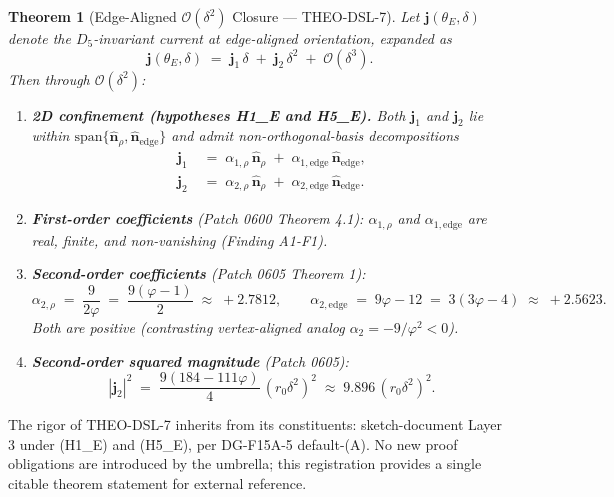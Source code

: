 \documentclass[11pt]{article}
\newtheorem{theorem}{Theorem}
\begin{document}
\begin{theorem}[Edge-Aligned $\mathcal{O}(\delta^2)$ Closure --- THEO-DSL-7]
\label{thm:THEO-DSL-7}
Let $\mathbf{j}(\theta_E, \delta)$ denote the $D_5$-invariant current at
edge-aligned orientation, expanded as
\[
\mathbf{j}(\theta_E, \delta) \;=\; \mathbf{j}_1\,\delta \;+\; \mathbf{j}_2\,\delta^2
\;+\; \mathcal{O}(\delta^3).
\]
Then through $\mathcal{O}(\delta^2)$:
\begin{enumerate}
\item[\textnormal{(i)}] \textbf{2D confinement (hypotheses H1\_E and H5\_E).}
Both $\mathbf{j}_1$ and $\mathbf{j}_2$ lie within
$\mathrm{span}\{\hat{\mathbf{n}}_\rho, \hat{\mathbf{n}}_{\text{edge}}\}$
and admit non-orthogonal-basis decompositions
\begin{align}
\mathbf{j}_1 &\;=\; \alpha_{1,\rho}\,\hat{\mathbf{n}}_\rho
              \;+\; \alpha_{1,\text{edge}}\,\hat{\mathbf{n}}_{\text{edge}}, \\
\mathbf{j}_2 &\;=\; \alpha_{2,\rho}\,\hat{\mathbf{n}}_\rho
              \;+\; \alpha_{2,\text{edge}}\,\hat{\mathbf{n}}_{\text{edge}}.
\end{align}

\item[\textnormal{(ii)}] \textbf{First-order coefficients} (Patch 0600
Theorem 4.1): $\alpha_{1,\rho}$ and $\alpha_{1,\text{edge}}$ are real,
finite, and non-vanishing (Finding A1-F1).

\item[\textnormal{(iii)}] \textbf{Second-order coefficients} (Patch 0605
Theorem 1):
\[
\alpha_{2,\rho} \;=\; \frac{9}{2\varphi} \;=\; \frac{9(\varphi-1)}{2}
\;\approx\; +2.7812,
\qquad
\alpha_{2,\text{edge}} \;=\; 9\varphi - 12 \;=\; 3(3\varphi-4)
\;\approx\; +2.5623.
\]
Both are positive (contrasting vertex-aligned analog $\alpha_2 = -9/\varphi^2 < 0$).

\item[\textnormal{(iv)}] \textbf{Second-order squared magnitude} (Patch 0605):
\[
|\mathbf{j}_2|^2 \;=\; \frac{9(184 - 111\varphi)}{4}\,(r_0\delta^2)^2
\;\approx\; 9.896\,(r_0\delta^2)^2.
\]
\end{enumerate}
\end{theorem}

\medskip
The rigor of THEO-DSL-7 inherits from its constituents: sketch-document
Layer 3 under (H1\_E) and (H5\_E), per DG-F15A-5 default-(A). No new
proof obligations are introduced by the umbrella; this registration
provides a single citable theorem statement for external reference.
\end{document}
